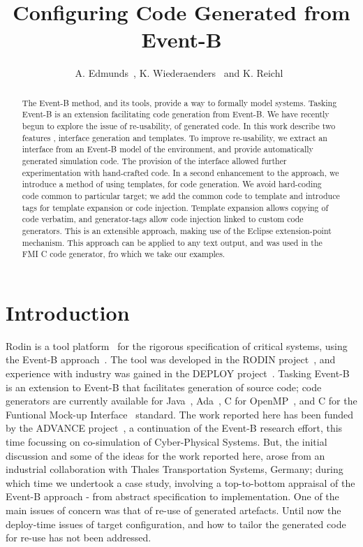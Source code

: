 \documentclass{llncs}%
\begin{document}
%
\title{Configuring Code Generated from Event-B}

\author{A. Edmunds~, K. Wiederaenders~ and K. Reichl~}


\maketitle
%
\begin{abstract}
The Event-B method, and  its tools, provide a way to formally model systems. Tasking Event-B is an extension facilitating code generation from Event-B.  We have recently begun to explore the issue of re-usability, of generated code. In this work describe two features , interface generation and templates. To improve re-usability, we extract an interface from an Event-B model of the environment, and provide automatically generated simulation code. The provision of the interface allowed further experimentation with hand-crafted code. In a second enhancement to the approach, we introduce a method of using templates, for code generation. We avoid hard-coding code common to particular target; we add the common code to template and introduce tags for template expansion or code injection. Template expansion allows copying of code verbatim, and generator-tags allow code injection linked to custom code generators. This is an extensible approach, making use of the Eclipse extension-point mechanism. This approach can be applied to any text output, and was used in the FMI C code generator, fro which we take our examples. 
 \end{abstract}
%
%
\section{Introduction}
%
Rodin is a  tool platform~\cite{abrial10rodin} for the rigorous specification of critical systems, using the Event-B approach~\cite{ABR10}. The tool was developed in the RODIN project~\cite{RodinTool}, and experience with industry was gained in the DEPLOY project~\cite{DEPLOY}. Tasking Event-B~\cite{Edmunds2009,Edmunds2008,ae2011a,ae2012b} is an extension to Event-B that facilitates generation of source code; code generators are currently available for Java~\cite{JavaSpec}, Ada~\cite{ada2005}, C for OpenMP~\cite{openmp}, and C for the Funtional Mock-up Interface~\cite{FMISTD} standard. The work reported here has been funded by the ADVANCE project~\cite{advance}, a continuation of the Event-B research effort, this time focussing on co-simulation of Cyber-Physical Systems. But, the initial discussion and some of the ideas for the work reported here, arose from an industrial collaboration with Thales Transportation Systems, Germany; during which time we undertook a case study, involving a top-to-bottom appraisal of the Event-B approach - from abstract specification to implementation. One of the main issues of concern was that of re-use of generated artefacts. Until now the deploy-time issues of target configuration, and how to tailor the generated code for re-use has not been addressed. 
\end{document}
